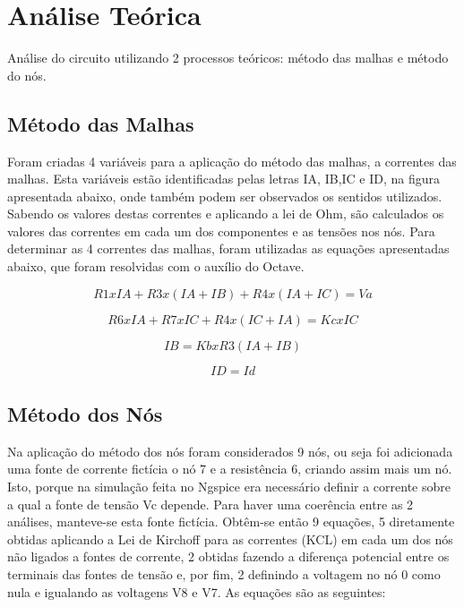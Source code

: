 \section{Análise Teórica}
\label{sec:analise_teorica}
Análise do circuito utilizando 2 processos teóricos: método das malhas e método do nós.
\subsection{Método das Malhas} 

Foram criadas 4 variáveis para a aplicação do método das malhas, a correntes das malhas. Esta variáveis estão identificadas pelas letras IA, IB,IC e ID, na figura apresentada abaixo, onde também podem ser observados os sentidos utilizados. Sabendo os valores destas correntes e aplicando a lei de Ohm, são calculados os valores das correntes em cada um dos componentes e as tensões nos nós. Para determinar as 4 correntes das malhas, foram utilizadas as equações apresentadas abaixo, que foram resolvidas com o auxílio do Octave. 

\begin {equation}
	R1xIA + R3x(IA+IB) + R4x(IA+IC) = Va
	\label{eq:malha1}
\end{equation}

\begin {equation}
	R6xIA + R7xIC + R4x(IC+IA) = KcxIC
	\label{eq:malha2}
\end{equation}

\begin {equation}
	IB = KbxR3(IA+IB)
	\label{eq:malha3}
\end{equation}

\begin {equation}
	ID = Id
	\label{eq:malha4}
\end{equation}


\subsection{Método dos Nós} 

Na aplicação do método dos nós foram considerados 9 nós, ou seja foi adicionada uma fonte de corrente fictícia o nó 7 e a resistência 6, criando assim mais um nó. Isto, porque na simulação feita no Ngspice era necessário definir a corrente sobre a qual a fonte de tensão Vc depende. Para haver uma coerência entre as 2 análises, manteve-se esta fonte fictícia. Obtêm-se então 9 equações, 5 diretamente obtidas aplicando a Lei de Kirchoff para as correntes (KCL) em cada um dos nós não ligados a fontes de corrente, 2 obtidas fazendo a diferença potencial entre os terminais das fontes de tensão e, por fim, 2 definindo a voltagem no nó 0 como nula e igualando as voltagens V8 e V7. As equações são as seguintes:\par


